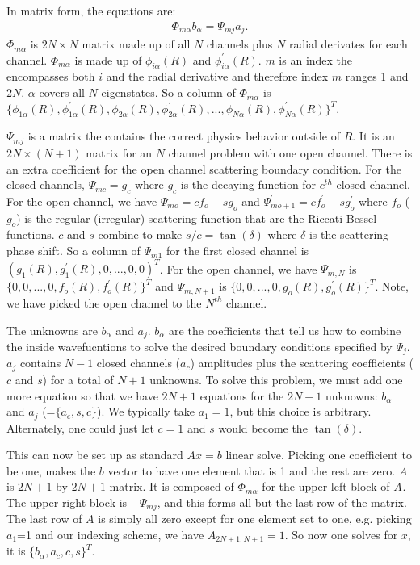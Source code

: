 \documentclass[twocolumn,showpacs,amsmath,amssymb]{revtex4}
\begin{document}
In matrix form, the equations are:
\begin{eqnarray}
\Phi_{m\alpha} b_\alpha= \Psi_{mj} a_j.
\end{eqnarray}
$\Phi_{m\alpha}$ is $2N\times N$ matrix made up of 
all $N$ channels plus $N$ radial derivates for each channel.
$\Phi_{m\alpha}$ is made up of 
$\phi_{i\alpha}(R)$ and $\phi^\prime_{i\alpha}(R)$.
$m$ is an index the encompasses both $i$
and the radial derivative and therefore index $m$ ranges 1 and $2N$.  
$\alpha$ covers all $N$ eigenstates.
So a column of $\Phi_{m\alpha}$ is
$\{\phi_{1\alpha}(R),\phi^\prime_{1\alpha}(R),
\phi_{2\alpha}(R),\phi^\prime_{2\alpha}(R),...,
\phi_{N\alpha}(R),\phi^\prime_{N\alpha}(R)\}^T$.

$\Psi_{mj}$ is a matrix the contains the correct physics behavior 
outside of $R$. It is an $2N\times (N+1)$ matrix for an $N$ channel problem with one open channel.
There is an extra coefficient for the open channel scattering boundary condition. 
For the closed channels, $\Psi_{mc}=g_c$ 
where $g_c$ is the decaying function for $c^{th}$ closed channel.
For the open channel, we have
$\Psi_{mo}=c f_o- s g_o$ and $\Psi_{mo+1}^\prime =c f_o^\prime - s g_o^\prime$
where $f_o$ ($g_o$) is the regular (irregular) scattering function that are
the Riccati-Bessel functions.
$c$ and $s$ combine to make $s/c=\tan(\delta)$ where $\delta$ is the scattering phase shift. So a column of $\Psi_{m1}$ for the first closed channel is
$(g_{1}(R),g_1^\prime(R),0,..., 0,0)^T$.
For the open channel, we have
 $\Psi_{m,N}$ is
 $\{0,0,...,0,f_{o}(R),f_o^\prime(R)\}^T$
and $\Psi_{m,N+1}$ is
$\{0,0,...,0,g_{o}(R),g_o^\prime(R)\}^T$.
Note, we have picked the open channel to the $N^{th}$ channel.


The unknowns are $b_\alpha$ and $a_j$.
$b_\alpha$ are the coefficients that tell us how to combine 
the inside wavefucntions to solve the desired boundary conditions
specified by $\Psi_j$.
$a_j$ contains $N-1$ closed channels ($a_c$) amplitudes plus
the scattering  coefficients ($c$ and $s$) for a total of $N+1$ unknowns. 
To solve this problem, we must add one more equation so that
we have $2N+1$ equations for the $2N+1$ unknowns: $b_\alpha$
and $a_j$ (=$\{a_c, s,c\}$).  We typically take $a_1=1$, but 
this choice is arbitrary. Alternately, one could just let $c=1$
and $s$ would become the $\tan(\delta)$.

This can now be set up as standard $Ax=b$ linear solve. 
Picking one coefficient to be one, makes the $b$ vector to have 
one element that is 1 and the rest are zero.
$A$ is $2N+1$ by $2N+1$ matrix.
It is composed of $\Phi_{m\alpha}$ for the upper left block of $A_{}$.
The upper right block is $-\Psi_{mj}$, and this forms all but the last row of the matrix.  
The last row of $A$ is simply all zero except for one element set to one, e.g. picking $a_1$=1 and our indexing scheme, we have $A_{2N+1,N+1}=1$.
So now one solves for $x$, it is $\{b_\alpha,a_c,c,s\}^T$.
\end{document}
